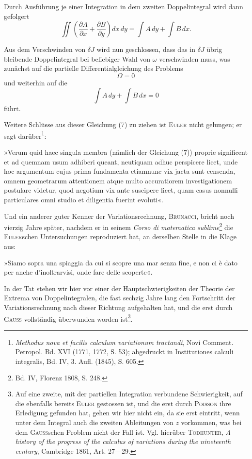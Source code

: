 Durch Ausführung je einer Integration in dem zweiten Doppelintegral
wird dann gefolgert
\begin{equation*}
\iint\left(\frac{\partial A}{\partial x}+\frac{\partial B}{\partial y}\right)dx\,dy=\int A\,dy+\int B\,dx.\tag{5}
\end{equation*}

Aus dem Verschwinden von $\delta J$ wird nun geschlossen, dass das in $\delta J$
übrig bleibende Doppelintegral bei beliebiger Wahl von $\omega$ verschwinden muss,
was zunächst auf die partielle Differentialgleichung des Problems
\begin{equation*}
\Omega=0\tag{6}
\end{equation*}
und weiterhin auf die 
\begin{equation*}
\int A\,dy+\int B\,dx=0\tag{7}
\end{equation*}
führt.

Weitere Schlüsse aus dieser Gleichung (7) zu ziehen ist \textsc{Euler} nicht gelungen;
er sagt darüber\footnote{\textit{Methodus nova et facilis calculum variationum tractandi}, Novi Comment. Petropol. Bd. XVI (1771, 1772, S. 53); abgedruckt in Institutiones calculi integralis, Bd. IV, 3. Aufl. (1845), S. 605.}:
\par\clearpage{}
\noindent\hspace*{\parindent}»Verum quid haec singula membra (nämlich der Gleichung (7)) proprie
significent et ad quemnam usum adhiberi queant, neutiquam adhuc perspicere
licet, unde hoc argumentum cujus prima fundamenta etiamnunc vix jacta sunt
censenda, omnem geometrarum attentionem atque multo accuratiorem investigationem
postulare videtur, quod negotium vix ante suscipere licet, quam
casus nonnulli particulares omni studio et diligentia fuerint evoluti«.

Und ein anderer guter Kenner der Variationsrechnung, \textsc{Brunacci}, bricht
noch vierzig Jahre später, nachdem er in seinem \textit{Corso di matematica sublime}\footnote{Bd. IV, Florenz 1808, S. 248.}
die \textsc{Euler}schen Untersuchungen reproduziert hat, an derselben Stelle in die
Klage aus:

»Siamo sopra una spiaggia da cui si scopre una mar senza fine, e non ci
è dato per anche d’inoltrarvisi, onde fare delle scoperte«.

In der Tat stehen wir hier vor einer der Hauptschwierigkeiten der Theorie
der Extrema von Doppelintegralen, die fast sechzig Jahre lang den Fortschritt
der Variationsrechnung nach dieser Richtung aufgehalten hat, und die erst
durch \textsc{Gauss} vollständig überwunden worden ist\footnote{Auf eine zweite, mit der partiellen Integration verbundene Schwierigkeit, auf die ebenfalls bereits \textsc{Euler} gestossen ist, und die erst durch \textsc{Poisson} ihre Erledigung gefunden hat, gehen wir hier nicht ein, da sie erst eintritt, wenn unter dem Integral auch die zweiten Ableitungen von $z$ vorkommen, was bei dem \textsc{Gauss}schen Problem nicht der Fall ist. Vgl. hierüber \textsc{Todhunter}, \textit{A history of the progress of the calculus of variations during the nineteenth century}, Cambridge 1861, Art. 27—29.}.

